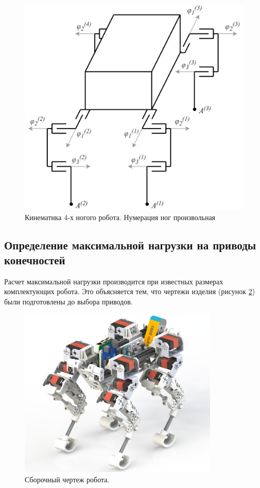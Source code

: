 \begin{figure}[ht]
    \centering
    \includegraphics[scale=1.16]{chapter_legged_robots/figure1.png}
    \caption{Кинематика 4-х ногого робота. Нумерация ног произвольная}
    \label{fig:kin_scheme1}
\end{figure}


\subsection{Определение максимальной нагрузки на приводы конечностей}

Расчет максимальной нагрузки производится при известных размерах комплектующих робота. Это объясняется тем, что чертежи изделия (рисунок \ref{fig:final_render}) были подготовлены до выбора приводов.

\begin{figure}[h]
    \centering
    \includegraphics[width=0.85\textwidth]{chapter_mechanics_construction/figure20.png}
    \caption{Сборочный чертеж робота.}
    \label{fig:final_render}
\end{figure}

